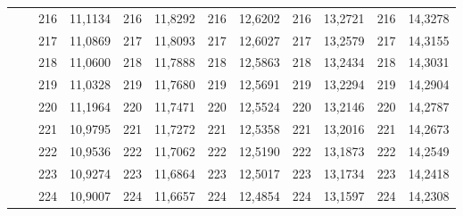 \documentclass[a4paper,12pt]{article} %
\begin{document}
\begin{longtable}[c]{cccccccccc|c|c|}
	& \multicolumn{1}{c|}{} & \multicolumn{1}{c|}{216} & \multicolumn{1}{c|}{11,1134} & \multicolumn{1}{c|}{216} & \multicolumn{1}{c|}{11,8292} & \multicolumn{1}{c|}{216} & \multicolumn{1}{c|}{12,6202} & \multicolumn{1}{c|}{216} & 13,2721 & 216 & 14,3278 \\ \cline{3-12} 
	& \multicolumn{1}{c|}{} & \multicolumn{1}{c|}{217} & \multicolumn{1}{c|}{11,0869} & \multicolumn{1}{c|}{217} & \multicolumn{1}{c|}{11,8093} & \multicolumn{1}{c|}{217} & \multicolumn{1}{c|}{12,6027} & \multicolumn{1}{c|}{217} & 13,2579 & 217 & 14,3155 \\ \cline{3-12} 
	& \multicolumn{1}{c|}{} & \multicolumn{1}{c|}{218} & \multicolumn{1}{c|}{11,0600} & \multicolumn{1}{c|}{218} & \multicolumn{1}{c|}{11,7888} & \multicolumn{1}{c|}{218} & \multicolumn{1}{c|}{12,5863} & \multicolumn{1}{c|}{218} & 13,2434 & 218 & 14,3031 \\ \cline{3-12} 
	& \multicolumn{1}{c|}{} & \multicolumn{1}{c|}{219} & \multicolumn{1}{c|}{11,0328} & \multicolumn{1}{c|}{219} & \multicolumn{1}{c|}{11,7680} & \multicolumn{1}{c|}{219} & \multicolumn{1}{c|}{12,5691} & \multicolumn{1}{c|}{219} & 13,2294 & 219 & 14,2904 \\ \cline{3-12} 
	& \multicolumn{1}{c|}{} & \multicolumn{1}{c|}{220} & \multicolumn{1}{c|}{11,1964} & \multicolumn{1}{c|}{220} & \multicolumn{1}{c|}{11,7471} & \multicolumn{1}{c|}{220} & \multicolumn{1}{c|}{12,5524} & \multicolumn{1}{c|}{220} & 13,2146 & 220 & 14,2787 \\ \cline{3-12} 
	& \multicolumn{1}{c|}{} & \multicolumn{1}{c|}{221} & \multicolumn{1}{c|}{10,9795} & \multicolumn{1}{c|}{221} & \multicolumn{1}{c|}{11,7272} & \multicolumn{1}{c|}{221} & \multicolumn{1}{c|}{12,5358} & \multicolumn{1}{c|}{221} & 13,2016 & 221 & 14,2673 \\ \cline{3-12} 
	& \multicolumn{1}{c|}{} & \multicolumn{1}{c|}{222} & \multicolumn{1}{c|}{10,9536} & \multicolumn{1}{c|}{222} & \multicolumn{1}{c|}{11,7062} & \multicolumn{1}{c|}{222} & \multicolumn{1}{c|}{12,5190} & \multicolumn{1}{c|}{222} & 13,1873 & 222 & 14,2549 \\ \cline{3-12} 
	& \multicolumn{1}{c|}{} & \multicolumn{1}{c|}{223} & \multicolumn{1}{c|}{10,9274} & \multicolumn{1}{c|}{223} & \multicolumn{1}{c|}{11,6864} & \multicolumn{1}{c|}{223} & \multicolumn{1}{c|}{12,5017} & \multicolumn{1}{c|}{223} & 13,1734 & 223 & 14,2418 \\ \cline{3-12} 
	& \multicolumn{1}{c|}{} & \multicolumn{1}{c|}{224} & \multicolumn{1}{c|}{10,9007} & \multicolumn{1}{c|}{224} & \multicolumn{1}{c|}{11,6657} & \multicolumn{1}{c|}{224} & \multicolumn{1}{c|}{12,4854} & \multicolumn{1}{c|}{224} & 13,1597 & 224 & 14,2308 \\ \cline{3-12} 

\end{longtable}
\end{document}
